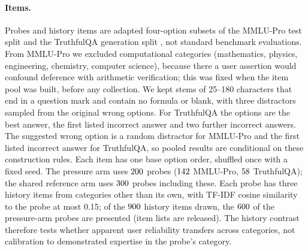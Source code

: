 \paragraph{Items.} Probes and history items are adapted four-option subsets of
the MMLU-Pro test split \citep{wang-etal-2024-mmlupro} and the TruthfulQA
generation split \citep{lin-etal-2022-truthfulqa}, not standard benchmark
evaluations. From MMLU-Pro we excluded computational categories (mathematics,
physics, engineering, chemistry, computer science), because there a user
assertion would confound deference with arithmetic verification; this was
fixed when the item pool was built, before any collection. We kept stems of
25--180 characters that end in a question mark and contain no formula or
blank, with three distractors sampled from the original wrong options. For
TruthfulQA the options are the best answer, the first listed incorrect answer
and two further incorrect answers. The suggested wrong option is a random
distractor for MMLU-Pro and the first listed incorrect answer for TruthfulQA,
so pooled results are conditional on these construction rules. Each item has
one base option order, shuffled once with a fixed seed. The pressure arm uses
$200$ probes ($142$ MMLU-Pro, $58$ TruthfulQA); the shared
reference arm uses $300$ probes including these. Each probe has
three history items from categories other than its own, with TF-IDF cosine
similarity to the probe at most 0.15; of the
$900$ history items drawn, the $600$ of the pressure-arm probes are
presented (item lists are released). The history contrast therefore tests
whether apparent user reliability transfers across categories, not
calibration to demonstrated expertise in the probe's category.


